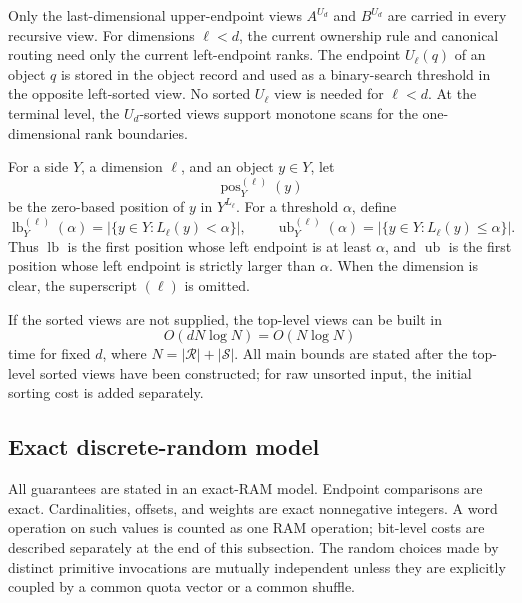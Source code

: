 \documentclass[11pt]{article}
\newcommand{\lb}{\operatorname{lb}}
\newcommand{\ub}{\operatorname{ub}}
\newcommand{\pos}{\operatorname{pos}}
\theoremstyle{definition}
\begin{document}
Only the last-dimensional upper-endpoint views $A^{U_d}$ and $B^{U_d}$ are carried in every recursive view.  For dimensions $\ell<d$, the current ownership rule and canonical routing need only the current left-endpoint ranks.  The endpoint $U_\ell(q)$ of an object $q$ is stored in the object record and used as a binary-search threshold in the opposite left-sorted view.  No sorted $U_\ell$ view is needed for $\ell<d$.  At the terminal level, the $U_d$-sorted views support monotone scans for the one-dimensional rank boundaries.

For a side $Y$, a dimension $\ell$, and an object $y\in Y$, let
\[
  \pos_Y^{(\ell)}(y)
\]
be the zero-based position of $y$ in $Y^{L_\ell}$.  For a threshold $\alpha$, define
\[
  \lb_Y^{(\ell)}(\alpha)=|\{y\in Y:L_\ell(y)<\alpha\}|,
  \qquad
  \ub_Y^{(\ell)}(\alpha)=|\{y\in Y:L_\ell(y)\le\alpha\}|.
\]
Thus $\lb$ is the first position whose left endpoint is at least $\alpha$, and $\ub$ is the first position whose left endpoint is strictly larger than $\alpha$.  When the dimension is clear, the superscript $(\ell)$ is omitted.

If the sorted views are not supplied, the top-level views can be built in
\[
  O(dN\log N)=O(N\log N)
\]
time for fixed $d$, where $N=|\mathcal R|+|\mathcal S|$.  All main bounds are stated after the top-level sorted views have been constructed; for raw unsorted input, the initial sorting cost is added separately.

\subsection{Exact discrete-random model}
\label{subsec:exact-model}

All guarantees are stated in an exact-RAM model.  Endpoint comparisons are exact.  Cardinalities, offsets, and weights are exact nonnegative integers.  A word operation on such values is counted as one RAM operation; bit-level costs are described separately at the end of this subsection.  The random choices made by distinct primitive invocations are mutually independent unless they are explicitly coupled by a common quota vector or a common shuffle.
\end{document}
